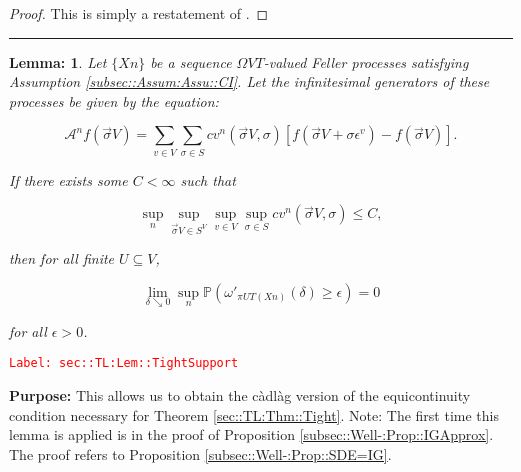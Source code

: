 \documentclass[12pt]{article}
\newcommand{\mb}{\mathbb}
\newcommand{\mc}{\mathcal}
\newcommand{\ep}{\epsilon}
\newcommand{\tr}{\textcolor{red}}
\newcommand{\labe}[1]{\tr{\texttt{Label: #1}}}
\newcommand{\purpose}{\textbf{Purpose: }}
\newcommand{\lin}{\rule{\linewidth}{0.4 pt}}
\newcommand{\pr}{\mb{P}}							%
\renewcommand{\v}{v}							%
\renewcommand{\U}{U}							%
\renewcommand{\S}{S}							%
\newcommand{\s}{\sigma}							%
\newcommand{\sv}{\vec{\s}}						%
\newcommand{\ev}[1]{\ep^{#1}}					%
\newcommand{\T}{T}								%
\newcommand{\proj}{\pi}							%
\newcommand{\X}{X}								%
\newcommand{\IG}{\mc{A}}						%
\newcommand{\IGr}{c}							%
\newcommand{\const}{C}							%
\newcommand{\sln}[1]{^{#1}}						%
\newcommand{\XState}[1]{\S^{#1}}				%
\newtheorem{lem}[thms]{Lemma: }
\begin{document}
\begin{proof}
This is simply a restatement of \cite[Theorem 13.2]{Bil99}.
\end{proof}

\lin

\begin{lem}
Let \(\{\X{}{}{n}\}\) be a sequence \(\Omega{ V}{\T}\)-valued Feller processes satisfying Assumption \ref{subsec::Assum:Assu::CI}. Let the infinitesimal generators of these processes be given by the equation:

\[\IG\sln{n}f(\sv{}{ V}) = \sum_{\v\in  V}\sum_{\s \in \S} \IGr{\v}\sln{n}(\sv{}{ V},\s)[f(\sv{}{ V} + \s\ev{\v}) - f(\sv{}{ V})].\]

If there exists some \(\const{} < \infty\) such that

\[\sup_{n}\sup_{\sv{}{ V}\in \S^ V}\sup_{\v\in V}\sup_{\s\in \S} \IGr{\v}\sln{n}(\sv{}{ V},\s) \leq \const{},\]

then for all finite \(\U \subseteq  V\),

\[\lim_{\delta \searrow 0} \sup_n \pr\left(\omega'_{\proj{\U}{\T}\left(\X{}{}{n}\right)}(\delta) \geq \ep\right) = 0\]

for all \(\ep > 0\).
\label{sec::TL:Lem::TightSupport}
\end{lem}
\labe{sec::TL:Lem::TightSupport}

\purpose This allows us to obtain the c\`adl\`ag version of the equicontinuity condition necessary for Theorem \ref{sec::TL:Thm::Tight}. Note: The first time this lemma is applied is in the proof of Proposition \ref{subsec::Well-:Prop::IGApprox}. The proof refers to Proposition \ref{subsec::Well-:Prop::SDE=IG}.
\end{document}
